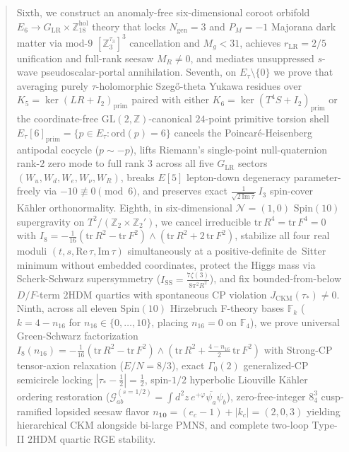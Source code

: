 \documentclass[aps,prd,twocolumn,nofootinbib,floatfix]{revtex4-2}
\begin{document}
\begin{abstract}
Sixth, we construct an anomaly-free six-dimensional coroot orbifold $E_6 \to G_{\mathrm{LR}} \times \mathbb{Z}_{18}^{\mathrm{hol}}$ theory that locks $N_{\mathrm{gen}} = 3$ and $P_M = -1$ Majorana dark matter via mod-$9$ $[\mathbb{Z}_3^{\tau_3}]^3$ cancellation and $M_g < 31$, achieves $r_{\mathrm{LR}} = 2/5$ unification and full-rank seesaw $M_R \ne 0$, and mediates unsuppressed $s$-wave pseudoscalar-portal annihilation.
Seventh, on $E_\tau\setminus\{0\}$ we prove that averaging purely $\tau$-holomorphic Szeg\H{o}-theta Yukawa residues over $K_5 = \ker(LR + I_2)_{\mathrm{prim}}$ paired with either $K_6 = \ker(T^4 S + I_2)_{\mathrm{prim}}$ or the coordinate-free $\mathrm{GL}(2,\mathbb{Z})$-canonical $24$-point primitive torsion shell $E_\tau[6]_{\mathrm{prim}} = \{p \in E_\tau : \mathrm{ord}(p) = 6\}$ cancels the Poincar\'e-Heisenberg antipodal cocycle ($p \sim -p$), lifts Riemann's single-point null-quaternion rank-$2$ zero mode to full rank $3$ across all five $G_{\mathrm{LR}}$ sectors $(W_u, W_d, W_e, W_\nu, W_R)$, breaks $E[5]$ lepton-down degeneracy parameter-freely via $-10 \not\equiv 0 \pmod 6$, and preserves exact $\frac{1}{\sqrt{2\,\mathrm{Im}\,\tau}}\,I_3$ spin-cover K\"ahler orthonormality.
Eighth, in six-dimensional $\mathcal{N}=(1,0)$ $\mathrm{Spin}(10)$ supergravity on $T^2/(\mathbb{Z}_2\times\mathbb{Z}_2')$, we cancel irreducible $\mathrm{tr}\,R^4 = \mathrm{tr}\,F^4 = 0$ with $I_8 = -\frac{1}{16}(\mathrm{tr}\,R^2 - \mathrm{tr}\,F^2)\wedge(\mathrm{tr}\,R^2 + 2\,\mathrm{tr}\,F^2)$, stabilize all four real moduli $(t, s, \mathrm{Re}\,\tau, \mathrm{Im}\,\tau)$ simultaneously at a positive-definite de~Sitter minimum without embedded coordinates, protect the Higgs mass via Scherk-Schwarz supersymmetry ($I_{\mathrm{SS}} = \frac{7\zeta(3)}{8\pi^2 R^2}$), and fix bounded-from-below $D/F$-term $2\mathrm{HDM}$ quartics with spontaneous CP violation $J_{\mathrm{CKM}}(\tau_*) \ne 0$.
Ninth, across all eleven $\mathrm{Spin}(10)$ Hirzebruch F-theory bases $\mathbb{F}_k$ ($k = 4 - n_{16}$ for $n_{16} \in \{0,\dots,10\}$, placing $n_{16} = 0$ on $\mathbb{F}_4$), we prove universal Green-Schwarz factorization $I_8(n_{16}) = -\frac{1}{16}(\mathrm{tr}\,R^2 - \mathrm{tr}\,F^2)\wedge(\mathrm{tr}\,R^2 + \frac{4-n_{16}}{2}\,\mathrm{tr}\,F^2)$ with Strong-CP tensor-axion relaxation ($E/N = 8/3$), exact $\Gamma_0(2)$ generalized-CP semicircle locking $|\tau_* - \frac{1}{2}| = \frac{1}{2}$, spin-$1/2$ hyperbolic Liouville K\"ahler ordering restoration ($\mathcal{G}_{ab}^{(s=1/2)} = \int d^2z\,e^{+\varphi}\overline{\psi_a}\psi_b$), zero-free-integer $8^3_4$ cusp-ramified lopsided seesaw flavor $n_{\mathbf{10}} = (e_c - 1) + |k_c| = (2,0,3)$ yielding hierarchical CKM alongside bi-large PMNS, and complete two-loop Type-II $2\mathrm{HDM}$ quartic RGE stability.

\end{abstract}
\end{document}
